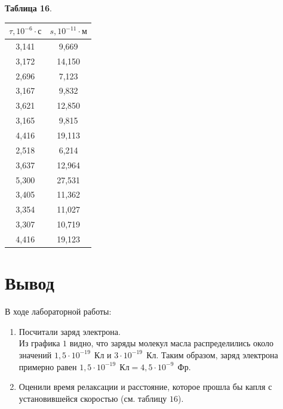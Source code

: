 \documentclass[11pt,a4paper]{article}
\begin{document}
\begin{table}[h!]
	\begin{center}
\textbf{Таблица 16}.\\
\begin{tabular}{|c|c|}
\hline
$\tau, 10^{-6} \cdot \text{с}$ & $s, 10^{-11} \cdot \text{м}$ \\ \hline
3,141 &	9,669 \\ \hline
3,172 & 14,150 \\ \hline
2,696 &	7,123 \\ \hline
3,167 &	9,832 \\ \hline
3,621 &	12,850 \\ \hline
3,165 &	9,815 \\ \hline
4,416 &	19,113 \\ \hline
2,518 &	6,214 \\ \hline
3,637 &	12,964 \\ \hline
5,300 &	27,531 \\ \hline
3,405 & 11,362 \\ \hline
3,354 &	11,027 \\ \hline
3,307 &	10,719 \\ \hline
4,416 &	19,123 \\ \hline
	\end{tabular}
	\end{center}
\end{table}


\part*{Вывод}
В ходе лабораторной работы:
\begin{enumerate}
	\item 
	Посчитали заряд электрона. \\ Из графика $1$ видно, что заряды молекул масла распределились около значений $1,5 \cdot 10^{-19} \ \ \text{Кл}$ и $3 \cdot 10^{-19} \ \ \text{Кл}$.
Таким образом, заряд электрона примерно равен $1,5 \cdot 10^{-19} \ \ \text{Кл} = 4,5 \cdot 10^{-9} \ \ \text{Фр}$.
\item Оценили время релаксации и расстояние, которое прошла бы капля с установившейся скоростью (см. таблицу $16$).
\end{enumerate}
\end{document}
